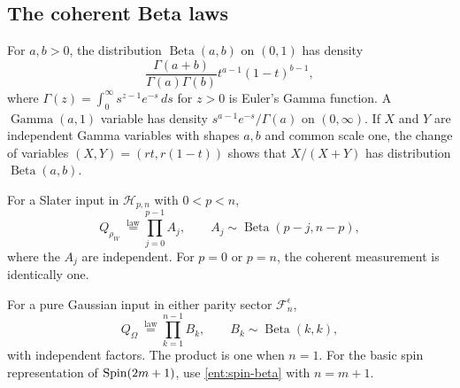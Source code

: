 \subsection{The coherent Beta laws}

For $a,b>0$, the distribution $\operatorname{Beta}(a,b)$ on $(0,1)$
has density
\[
 \frac{\Gamma(a+b)}{\Gamma(a)\Gamma(b)}
 t^{a-1}(1-t)^{b-1},
\]
where $\Gamma(z)=\int_0^\infty s^{z-1}e^{-s}\,ds$ for $z>0$
is Euler's Gamma function. A $\operatorname{Gamma}(a,1)$ variable
has density $s^{a-1}e^{-s}/\Gamma(a)$ on $(0,\infty)$.
If $X$ and $Y$ are independent Gamma variables with shapes $a,b$
and common scale one, the change of variables
$(X,Y)=(rt,r(1-t))$ shows that $X/(X+Y)$ has distribution
$\operatorname{Beta}(a,b)$.

\begin{proposition}
\label{ent:beta-products}
For a Slater input in $\mathcal H_{p,n}$ with $0<p<n$,
\begin{equation}
 Q_{\rho_W}\ \overset{\mathrm{law}}=
 \prod_{j=0}^{p-1} A_j,
 \qquad
 A_j\sim\operatorname{Beta}(p-j,n-p),
 \label{ent:exterior-beta}
\end{equation}
where the $A_j$ are independent. For $p=0$ or $p=n$, the coherent
measurement is identically one.

For a pure Gaussian input in either parity sector $\mathcal F_n^\epsilon$,
\begin{equation}
 Q_{\Omega}\ \overset{\mathrm{law}}=
 \prod_{k=1}^{n-1} B_k,
 \qquad B_k\sim\operatorname{Beta}(k,k),
 \label{ent:spin-beta}
\end{equation}
with independent factors. The product is one when $n=1$.
For the basic spin representation of $\operatorname{Spin}(2m+1)$, use
\eqref{ent:spin-beta} with $n=m+1$.
\end{proposition}
